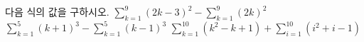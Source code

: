 다음 식의 값을 구하시오.
 $\displaystyle\sum_{k=1}^{9}(2k-3)^2-\sum_{k=1}^{9}(2k)^2$
 $\displaystyle\sum_{k=1}^{5}(k+1)^3-\sum_{k=1}^{5}(k-1)^3$
 $\displaystyle\sum_{k=1}^{10}(k^2-k+1)+\sum_{i=1}^{10}(i^2+i-1)$
